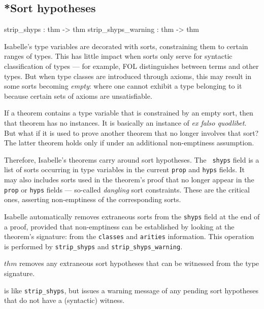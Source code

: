 \subsection{*Sort hypotheses} \label{sec:sort-hyps}
\begin{ttbox} 
strip_shyps         : thm -> thm
strip_shyps_warning : thm -> thm
\end{ttbox}

Isabelle's type variables are decorated with sorts, constraining them to
certain ranges of types.  This has little impact when sorts only serve for
syntactic classification of types --- for example, FOL distinguishes between
terms and other types.  But when type classes are introduced through axioms,
this may result in some sorts becoming {\em empty\/}: where one cannot exhibit
a type belonging to it because certain sets of axioms are unsatisfiable.

If a theorem contains a type variable that is constrained by an empty
sort, then that theorem has no instances.  It is basically an instance
of {\em ex falso quodlibet}.  But what if it is used to prove another
theorem that no longer involves that sort?  The latter theorem holds
only if under an additional non-emptiness assumption.

Therefore, Isabelle's theorems carry around sort hypotheses.  The {\tt
shyps} field is a list of sorts occurring in type variables in the current
{\tt prop} and {\tt hyps} fields.  It may also includes sorts used in the
theorem's proof that no longer appear in the {\tt prop} or {\tt hyps}
fields --- so-called {\em dangling\/} sort constraints.  These are the
critical ones, asserting non-emptiness of the corresponding sorts.
 
Isabelle automatically removes extraneous sorts from the {\tt shyps} field at
the end of a proof, provided that non-emptiness can be established by looking
at the theorem's signature: from the {\tt classes} and {\tt arities}
information.  This operation is performed by \texttt{strip_shyps} and
\texttt{strip_shyps_warning}.

\begin{ttdescription}
  
\item[\ttindexbold{strip_shyps} $thm$] removes any extraneous sort hypotheses
  that can be witnessed from the type signature.
  
\item[\ttindexbold{strip_shyps_warning}] is like \texttt{strip_shyps}, but
  issues a warning message of any pending sort hypotheses that do not have a
  (syntactic) witness.

\end{ttdescription}


